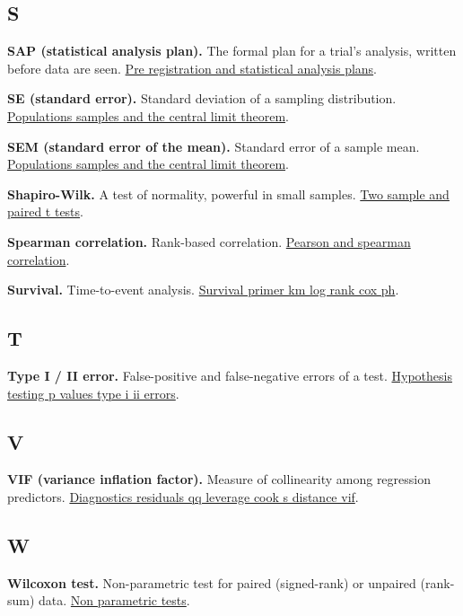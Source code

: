 \documentclass[
]{article}
\begin{document}
\subsection{S}\label{s}

\textbf{SAP (statistical analysis plan).} The formal plan for a trial's
analysis, written before data are seen.
\href{../chapters/16-design/labs/lab-pre-registration-and-statistical-analysis-plans.Rmd}{Pre
registration and statistical analysis plans}.

\textbf{SE (standard error).} Standard deviation of a sampling
distribution.
\href{../chapters/04-inferential/labs/lab-populations-samples-and-the-central-limit-theorem.Rmd}{Populations
samples and the central limit theorem}.

\textbf{SEM (standard error of the mean).} Standard error of a sample
mean.
\href{../chapters/04-inferential/labs/lab-populations-samples-and-the-central-limit-theorem.Rmd}{Populations
samples and the central limit theorem}.

\textbf{Shapiro-Wilk.} A test of normality, powerful in small samples.
\href{../chapters/04-inferential/labs/lab-two-sample-and-paired-t-tests.Rmd}{Two
sample and paired t tests}.

\textbf{Spearman correlation.} Rank-based correlation.
\href{../chapters/04-inferential/labs/lab-pearson-and-spearman-correlation.Rmd}{Pearson
and spearman correlation}.

\textbf{Survival.} Time-to-event analysis.
\href{../chapters/11-survival/labs/lab-survival-primer-km-log-rank-cox-ph.Rmd}{Survival
primer km log rank cox ph}.

\subsection{T}\label{t}

\textbf{Type I / II error.} False-positive and false-negative errors of
a test.
\href{../chapters/04-inferential/labs/lab-hypothesis-testing-p-values-type-i-ii-errors.Rmd}{Hypothesis
testing p values type i ii errors}.

\subsection{V}\label{v}

\textbf{VIF (variance inflation factor).} Measure of collinearity among
regression predictors.
\href{../chapters/07-regression/labs/lab-diagnostics-residuals-qq-leverage-cook-s-distance-vif.Rmd}{Diagnostics
residuals qq leverage cook s distance vif}.

\subsection{W}\label{w}

\textbf{Wilcoxon test.} Non-parametric test for paired (signed-rank) or
unpaired (rank-sum) data.
\href{../chapters/04-inferential/labs/lab-non-parametric-tests.Rmd}{Non
parametric tests}.
\end{document}
